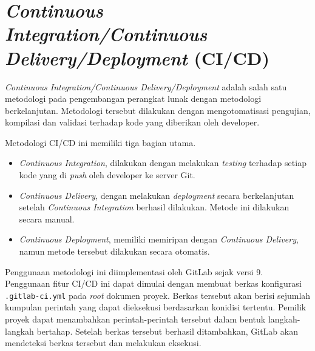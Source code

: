 \section{\textit{Continuous Integration/Continuous Delivery/Deployment} (CI/CD)}

    \textit{Continuous Integration/Continuous Delivery/Deployment} adalah salah
    satu metodologi pada pengembangan perangkat lunak dengan metodologi
    berkelanjutan. Metodologi tersebut dilakukan dengan mengotomatisasi
    pengujian, kompilasi dan validasi terhadap kode yang diberikan oleh
    developer\cite{gitlab-cicd:methodologies}.
    
    Metodologi CI/CD ini memiliki tiga bagian
    utama\cite{gitlab-cicd:methodologies}.
    \begin{itemize}
        \item \textit{Continuous Integration}, dilakukan dengan melakukan
        \textit{testing} terhadap setiap kode yang di \textit{push} oleh
        developer ke server Git.
        
        \item \textit{Continuous Delivery}, dengan melakukan \textit{deployment}
        secara berkelanjutan setelah \textit{Continuous Integration} berhasil
        dilakukan. Metode ini dilakukan secara manual.
        
        \item \textit{Continuous Deployment}, memiliki memiripan dengan
        \textit{Continuous Delivery}, namun metode tersebut dilakukan secara
        otomatis.
    \end{itemize}
    
    Penggunaan metodologi ini diimplementasi oleh GitLab sejak versi
    9\cite{gitlab-cicd:introduction}.  Penggunaan fitur CI/CD ini dapat dimulai
    dengan membuat berkas konfigurasi \texttt{.gitlab-ci.yml} pada \textit{root}
    dokumen proyek. Berkas tersebut akan berisi sejumlah kumpulan perintah yang
    dapat dieksekusi berdasarkan konidisi tertentu. Pemilik proyek dapat
    menambahkan perintah-perintah tersebut dalam bentuk langkah-langkah
    bertahap. Setelah berkas tersebut berhasil ditambahkan, GitLab akan
    mendeteksi berkas tersebut dan melakukan eksekusi.
    
